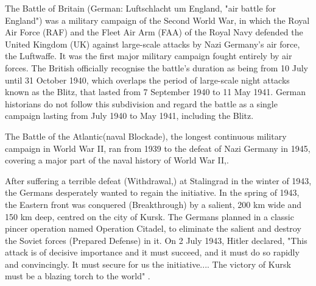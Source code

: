\documentclass[]{article}
\begin{document}
The Battle of Britain (German: Luftschlacht um England, "air battle for England") was a military campaign of the Second World War, in which the Royal Air Force (RAF) and the Fleet Air Arm (FAA) of the Royal Navy defended the United Kingdom (UK) against large-scale attacks by Nazi Germany's air force, the Luftwaffe. It was the first major military campaign fought entirely by air forces\cite{BattleOfBritain}. The British officially recognise the battle's duration as being from 10 July until 31 October 1940, which overlaps the period of large-scale night attacks known as the Blitz, that lasted from 7 September 1940 to 11 May 1941\cite{BattleOfBritain2}. German historians do not follow this subdivision and regard the battle as a single campaign lasting from July 1940 to May 1941, including the Blitz\cite{overy2013bombing}.


The Battle of the Atlantic(naval Blockade), the longest continuous military campaign in World War II, ran from 1939 to the defeat of Nazi Germany in 1945, covering a major part of the naval history of World War II\cite{blair2010hitler},\cite{woodman2011real}.

After suffering a terrible defeat (\Gls{Withdrawal},) at Stalingrad in the winter of 1943, the Germans desperately wanted to regain the initiative. In the spring of 1943, the Eastern front was conquered (\Gls{Breakthrough}) by a salient, 200 km wide and 150 km deep, centred on the city of Kursk. The Germans planned in a classic pincer operation named Operation Citadel, to eliminate the salient and destroy the Soviet forces (\Gls{Prepared Defense}) in it. On 2 July 1943, Hitler declared, "This attack is of decisive importance and it must succeed, and it must do so rapidly and convincingly. It must secure for us the initiative.... The victory of Kursk must be a blazing torch to the world" \autocite{JohsonMackey:2011,Klug:2003,Wiki}.
\end{document}
